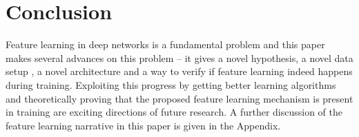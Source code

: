 \documentclass{article} %
\renewcommand{\>}{{\rightarrow}}
\renewcommand{\=}{\stackrel{\triangle}{=}}
\newcommand{\0}{{\mathbf 0}}
\begin{document}


\section{Conclusion}

Feature learning in deep networks is a fundamental problem and this paper makes several advances on this problem --  it gives a novel hypothesis, a novel data setup , a novel architecture and a way to verify if feature learning indeed happens during training. Exploiting this progress by getting better learning algorithms and theoretically proving that the proposed feature learning mechanism is present in training are exciting directions of future research. A further discussion of the feature learning narrative in this paper is given in the Appendix. 
\end{document}
